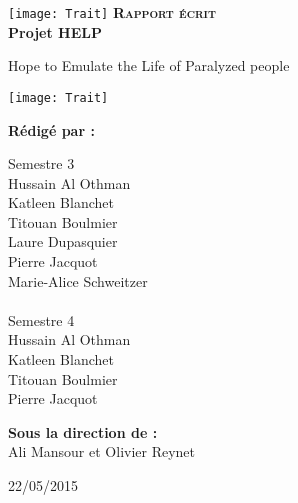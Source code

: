 \begingroup
\thispagestyle{empty}
\begin{center}
\vspace*{4.5cm}
\texttt{[image: Trait]}
{\Huge \textsc{\textbf{Rapport écrit}}}\\
\vspace*{1cm}
{\Huge \textbf{Projet HELP}}\par %
\vspace*{1cm}
{\huge Hope to Emulate the Life of Paralyzed people}\par %
\texttt{[image: Trait]}
\end{center}

\begin{center}
\large \textbf{Rédigé par :}\\
\end{center}

\begin{multicols}{2}
{\setlength{\baselineskip}{1.5\baselineskip}
{\large Semestre 3\\
Hussain Al Othman\\
Katleen Blanchet\\
Titouan Boulmier\\
Laure Dupasquier\\
Pierre Jacquot\\
Marie-Alice Schweitzer\\
\columnbreak\\
\hspace*{3cm}
Semestre 4\\
\hspace*{2.5cm}
Hussain Al Othman\\
\hspace*{2.5cm}
Katleen Blanchet\\
\hspace*{2.5cm}
Titouan Boulmier\\
\hspace*{2.5cm}
Pierre Jacquot\\}
\par}
\end{multicols}

\begin{center}
\large
\textbf{Sous la direction de :}\\
Ali Mansour et Olivier Reynet
\end{center}

\vspace*{1.2cm}
\begin{center}
\large
22/05/2015
\end{center}


\endgroup

